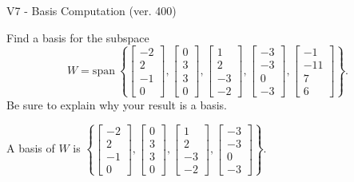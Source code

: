 \begin{exercise}
  \begin{exerciseTitle}V7 - Basis Computation (ver. 400)\end{exerciseTitle}
  \begin{exerciseStatement}
    Find a basis for the subspace 
\[W=\mathrm{span}\ \left\{\left[\begin{array}{r}
-2 \\
2 \\
-1 \\
0
\end{array}\right] , \left[\begin{array}{r}
0 \\
3 \\
3 \\
0
\end{array}\right] , \left[\begin{array}{r}
1 \\
2 \\
-3 \\
-2
\end{array}\right] , \left[\begin{array}{r}
-3 \\
-3 \\
0 \\
-3
\end{array}\right] , \left[\begin{array}{r}
-1 \\
-11 \\
7 \\
6
\end{array}\right]\right\}.\]
 Be sure to explain why your result is a basis.


  \end{exerciseStatement}
  \begin{exerciseAnswer}
   A basis of \(W\) is  \(\left\{\left[\begin{array}{r}
-2 \\
2 \\
-1 \\
0
\end{array}\right] , \left[\begin{array}{r}
0 \\
3 \\
3 \\
0
\end{array}\right] , \left[\begin{array}{r}
1 \\
2 \\
-3 \\
-2
\end{array}\right] , \left[\begin{array}{r}
-3 \\
-3 \\
0 \\
-3
\end{array}\right]\right\}\).
  


  \end{exerciseAnswer}
\end{exercise}